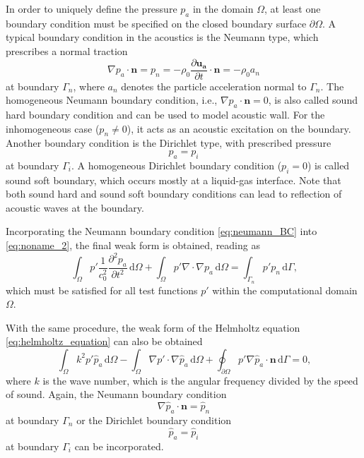In order to uniquely define the pressure $p_a$ in the domain $\Omega$, at least one boundary condition must be specified on the closed boundary surface $\partial \Omega$. A typical boundary condition in the acoustics is the Neumann type, which prescribes a normal traction
\begin{equation}
	\nabla p_a \cdot \boldsymbol{n} = p_n = -\rho_0\frac{\partial \boldsymbol{u_a}}{\partial t}\cdot\boldsymbol{n} = -\rho_0 a_n \label{eq:neumann_BC}
\end{equation}
at boundary $\Gamma_n$, where $a_n$ denotes the particle acceleration normal to $\Gamma_n$. The homogeneous Neumann boundary condition, i.e., $\nabla p_a \cdot \boldsymbol{n} = 0$, is also called sound hard boundary condition and can be used to model acoustic wall. For the inhomogeneous case ($p_n \neq 0$), it acts as an acoustic excitation on the boundary. Another boundary condition is the Dirichlet type, with prescribed pressure
\begin{equation}
	p_a = p_i \label{eq:dirichlet_BC}
\end{equation}
at boundary $\Gamma_i$. A homogeneous Dirichlet boundary condition ($p_i = 0$) is called sound soft boundary, which occurs mostly at a liquid-gas interface. Note that both sound hard and sound soft boundary conditions can lead to reflection of acoustic waves at the boundary.

Incorporating the Neumann boundary condition \cref{eq:neumann_BC} into \cref{eq:noname_2}, the final weak form is obtained, reading as
\begin{equation}
		\int_{\Omega}p'\frac{1}{c_0^2}\frac{\partial^2 p_a}{\partial t^2}\,\text{d}\Omega + \int_{\Omega}p'\nabla\cdot\nabla p_a\,\text{d}\Omega = \int_{\Gamma_n}p'p_n\,\text{d}\Gamma\text{,}
\end{equation}
which must be satisfied for all test functions $p'$ within the computational domain $\Omega$.

With the same procedure, the weak form of the Helmholtz equation \cref{eq:helmholtz_equation} can also be obtained
\begin{equation}
	\int_{\Omega}k^2p'\hat{p}_a\,\text{d}\Omega - \int_{\Omega}\nabla p' \cdot \nabla\hat{p}_a\,\text{d}\Omega + \oint_{\partial\Omega} p'\nabla \hat{p}_a \cdot \boldsymbol{n}\,\text{d}\Gamma = 0 \text{,}
\end{equation}
where $k$ is the wave number, which is the angular frequency divided by the speed of sound. Again, the Neumann boundary condition
\begin{equation}
	\nabla\hat{p}_a \cdot\boldsymbol{n} = \hat{p}_n
\end{equation}
at boundary $\Gamma_n$ or the Dirichlet boundary condition
\begin{equation}
	\hat{p}_a = \hat{p}_i
\end{equation}
at boundary $\Gamma_i$ can be incorporated.
\newpage

